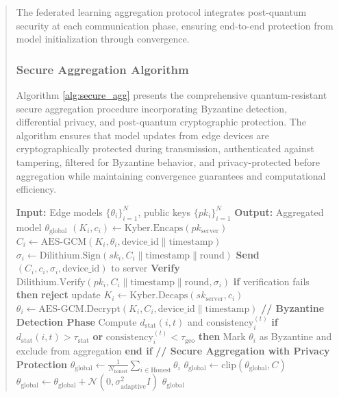 \documentclass{svproc}
\begin{document}
\begin{abstract}
The federated learning aggregation protocol integrates post-quantum security at each communication phase, ensuring end-to-end protection from model initialization through convergence.

\subsubsection{Secure Aggregation Algorithm}

Algorithm \ref{alg:secure_agg} presents the comprehensive quantum-resistant secure aggregation procedure incorporating Byzantine detection, differential privacy, and post-quantum cryptographic protection. The algorithm ensures that model updates from edge devices are cryptographically protected during transmission, authenticated against tampering, filtered for Byzantine behavior, and privacy-protected before aggregation while maintaining convergence guarantees and computational efficiency.

\begin{algorithm}[t]
\caption{Quantum-Resistant Secure Aggregation}
\label{alg:secure_agg}
\begin{algorithmic}[1]
\State \textbf{Input:} Edge models $\{\theta_i\}_{i=1}^N$, public keys $\{pk_i\}_{i=1}^N$
\State \textbf{Output:} Aggregated model $\theta_{\text{global}}$
\State
{}
    \State $(K_i, c_i) \leftarrow \text{Kyber.Encaps}(pk_{\text{server}})$
    \State $C_i \leftarrow \text{AES-GCM}(K_i, \theta_i, \text{device\_id} \| \text{timestamp})$
    \State $\sigma_i \leftarrow \text{Dilithium.Sign}(sk_i, C_i \| \text{timestamp} \| \text{round})$
    \State \textbf{Send} $(C_i, c_i, \sigma_i, \text{device\_id})$ to server
\EndFor
\State
{}
    \State \textbf{Verify} $\text{Dilithium.Verify}(pk_i, C_i \| \text{timestamp} \| \text{round}, \sigma_i)$
    \State \textbf{if} verification fails \textbf{then} \textbf{reject} update
    \State $K_i \leftarrow \text{Kyber.Decaps}(sk_{\text{server}}, c_i)$
    \State $\theta_i \leftarrow \text{AES-GCM.Decrypt}(K_i, C_i, \text{device\_id} \| \text{timestamp})$
\EndFor
\State
\State \textbf{// Byzantine Detection Phase}
    \State Compute $d_{\text{stat}}(i, t)$ and $\text{consistency}_i^{(t)}$
    \State \textbf{if} $d_{\text{stat}}(i, t) > \tau_{\text{stat}}$ \textbf{or} $\text{consistency}_i^{(t)} < \tau_{\text{geo}}$ \textbf{then}
        \State Mark $\theta_i$ as Byzantine and exclude from aggregation
    \State \textbf{end if}
\EndFor
\State
\State \textbf{// Secure Aggregation with Privacy Protection}
\State $\theta_{\text{global}} \leftarrow \frac{1}{N_{\text{honest}}} \sum_{i \in \text{Honest}} \theta_i$ 
\State $\theta_{\text{global}} \leftarrow \text{clip}(\theta_{\text{global}}, C)$ 
\State $\theta_{\text{global}} \leftarrow \theta_{\text{global}} + \mathcal{N}(0, \sigma_{\text{adaptive}}^2 I)$ 
\State \Return $\theta_{\text{global}}$
\end{algorithmic}
\end{algorithm}


\end{abstract}
\end{document}
